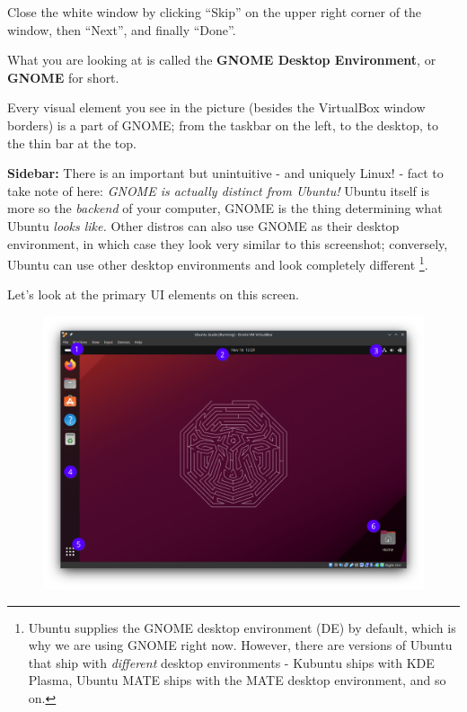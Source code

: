 \documentclass[12pt]{article}
\begin{document}
Close the white window by clicking ``Skip'' on the upper right corner of the window, then ``Next'', and finally ``Done''.

What you are looking at is called the \textbf{GNOME Desktop Environment}, or \textbf{GNOME} for short. 

Every visual element you see in the picture (besides the VirtualBox window borders) is a part of GNOME; from the taskbar on the left, to the desktop, to the thin bar at the top. \vspace{5mm}

\textbf{Sidebar:} There is an important but unintuitive - and uniquely Linux! - fact to take note of here: \textit{GNOME is actually distinct from Ubuntu!} Ubuntu itself is more so the \textit{backend} of your computer, GNOME is the thing determining what Ubuntu \textit{looks like.} Other distros can also use GNOME as their desktop environment, in which case they look very similar to this screenshot; conversely, Ubuntu can use other desktop environments and look completely different \footnote{Ubuntu supplies the GNOME desktop environment (DE) by default, which is why we are using GNOME right now. However, there are versions of Ubuntu that ship with \textit{different} desktop environments - Kubuntu ships with KDE Plasma, Ubuntu MATE ships with the MATE desktop environment, and so on.}.
\vspace{5mm}

Let's look at the primary UI elements on this screen.

\begin{figure}[htp]
    \centering
    \includegraphics[width=\textwidth]{2-2.png}
\end{figure}
\end{document}
